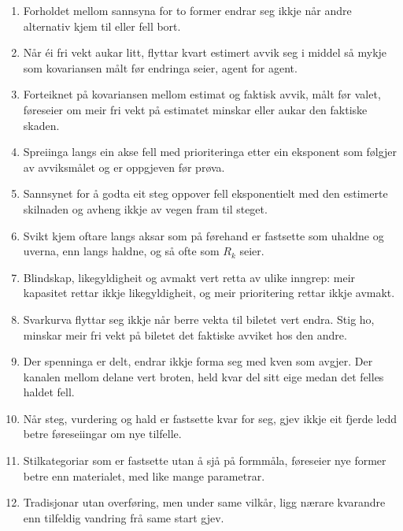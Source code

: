 \documentclass[9pt,twocolumn,a4paper]{article}
\theoremstyle{defstyle}
\theoremstyle{formstyle}
\begin{document}
\begin{enumerate}
\item Forholdet mellom sannsyna for to former endrar seg ikkje når andre alternativ kjem til eller fell bort.
\item Når éi fri vekt aukar litt, flyttar kvart estimert avvik seg i middel så mykje som kovariansen målt før endringa seier, agent for agent.
\item Forteiknet på kovariansen mellom estimat og faktisk avvik, målt før valet, føreseier om meir fri vekt på estimatet minskar eller aukar den faktiske skaden.
\item Spreiinga langs ein akse fell med prioriteringa etter ein eksponent som følgjer av avviksmålet og er oppgjeven før prøva.
\item Sannsynet for å godta eit steg oppover fell eksponentielt med den estimerte skilnaden og avheng ikkje av vegen fram til steget.
\item Svikt kjem oftare langs aksar som på førehand er fastsette som uhaldne og uverna, enn langs haldne, og så ofte som $R_k$ seier.
\item Blindskap, likegyldigheit og avmakt vert retta av ulike inngrep: meir kapasitet rettar ikkje likegyldigheit, og meir prioritering rettar ikkje avmakt.
\item Svarkurva flyttar seg ikkje når berre vekta til biletet vert endra. Stig ho, minskar meir fri vekt på biletet det faktiske avviket hos den andre.
\item Der spenninga er delt, endrar ikkje forma seg med kven som avgjer. Der kanalen mellom delane vert broten, held kvar del sitt eige medan det felles haldet fell.
\item Når steg, vurdering og hald er fastsette kvar for seg, gjev ikkje eit fjerde ledd betre føreseiingar om nye tilfelle.
\item Stilkategoriar som er fastsette utan å sjå på formmåla, føreseier nye former betre enn materialet, med like mange parametrar.
\item Tradisjonar utan overføring, men under same vilkår, ligg nærare kvarandre enn tilfeldig vandring frå same start gjev.
\end{enumerate}
\end{document}
